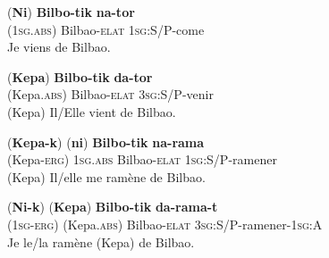 \documentclass[oldfontcommands,twoside,a4paper,12pt]{article}
\newcommand{\ipa}[1]{{\phon\textbf{#1}}}
\begin{document}
\begin{exe}
\ex 
\label{ex:1a}
\gll (\ipa{Ni}) \ipa{Bilbo-tik} \ipa{na-tor}\\
(\textsc{1sg.abs}) {Bilbao-\textsc{elat}} {\textsc{1sg}:S/P-come}\\ %
\trans Je viens de Bilbao.
\end{exe}

\begin{exe}
\ex 
\label{ex:1a}
\gll (\ipa{Kepa}) \ipa{Bilbo-tik} \ipa{da-tor}\\
(Kepa.\textsc{abs}) {Bilbao-\textsc{elat}} {\textsc{3sg}:S/P-venir}\\ %
\trans (Kepa) Il/Elle vient de Bilbao.
\end{exe}


\begin{exe}
\ex 
\label{ex:1a}
\gll (\ipa{Kepa-k}) (\ipa{ni}) \ipa{Bilbo-tik} \ipa{na-rama}\\
(Kepa-\textsc{erg}) {\textsc{1sg.abs}} {Bilbao-\textsc{elat}} {\textsc{1sg}:S/P-ramener}\\ %
\trans (Kepa) Il/elle me ramène de Bilbao.
\end{exe}

\begin{exe}
\ex 
\label{ex:1a}
\gll (\ipa{Ni-k}) (\ipa{Kepa}) \ipa{Bilbo-tik} \ipa{da-rama-t}\\
({\textsc{1sg-erg}}) (Kepa.\textsc{abs}) {Bilbao-\textsc{elat}} {\textsc{3sg}:S/P-ramener-\textsc{1sg:A}}\\ %
\trans Je le/la ramène (Kepa) de Bilbao.
\end{exe}
\end{document}
